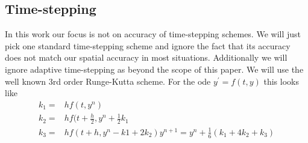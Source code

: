 \documentclass[10]{amsart}
\begin{document}
 \subsection{Time-stepping}
 In this work our focus is not on accuracy of time-stepping schemes. We will just pick one standard
 time-stepping scheme and ignore the fact that its accuracy does not match our spatial accuracy in most situations.
 Additionally we will ignore adaptive time-stepping as beyond the
 scope of this paper. We will use the well known $3$rd order Runge-Kutta scheme. For the ode $y^{'}=f(t,y)$ this looks like
 \begin{align*}
  k_1=&hf(t,y^n)\\
  k_2=&h f(t+\frac{h}{2},y^n+\frac{1}{2}k_1\\
  k_3=&h f(t+h,y^n - k1 +2 k_2)
  y^{n+1}=y^n+\frac{1}{6} \left(k_1 + 4 k_2 + k_3\right)
 \end{align*}

 
\end{document}
